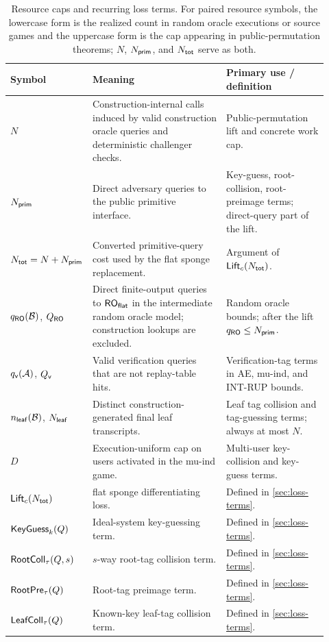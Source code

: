 \begin{table}[t]
  \centering
  \footnotesize
  \setlength{\tabcolsep}{3pt}
  \begin{tabular}{@{}p{0.18\linewidth}p{0.42\linewidth}p{0.32\linewidth}@{}}
    \toprule
    Symbol & Meaning & Primary use / definition \\
    \midrule
    $N$
      & Construction-internal \Keccakp{} calls induced by valid construction
        oracle queries and deterministic challenger checks.
      & Public-permutation lift and concrete work cap. \\
    $N_{\mathsf{prim}}$
      & Direct adversary queries to the public primitive interface.
      & Key-guess, root-collision, root-preimage terms; direct-query part of
        the lift. \\
    $N_{\mathsf{tot}} = N + N_{\mathsf{prim}}$
      & Converted primitive-query cost used by the flat sponge replacement.
      & Argument of $\mathsf{Lift}_c(N_{\mathsf{tot}})$. \\
    $q_{\mathsf{RO}}(\mathcal{B})$, $Q_{\mathsf{RO}}$
      & Direct finite-output queries to $\mathsf{RO}_{\mathsf{flat}}$ in the intermediate random
        oracle model; construction lookups are excluded.
      & Random oracle bounds; after the lift $q_{\mathsf{RO}} \leq N_{\mathsf{prim}}$. \\
    $q_{\mathsf{v}}(\mathcal{A})$, $Q_{\mathsf{v}}$
      & Valid verification queries that are not replay-table hits.
      & Verification-tag terms in AE, mu-ind, and \textsf{INT-RUP} bounds. \\
    $n_{\mathsf{leaf}}(\mathcal{B})$, $N_{\mathsf{leaf}}$
      & Distinct construction-generated final leaf transcripts.
      & Leaf tag collision and tag-guessing terms; always at most $N$. \\
    $D$
      & Execution-uniform cap on users activated in the mu-ind game.
      & Multi-user key-collision and key-guess terms. \\
    \midrule
    $\mathsf{Lift}_c(N_{\mathsf{tot}})$
      & \cite{BDPV08} flat sponge differentiating loss.
      & Defined in \cref{sec:loss-terms}. \\
    $\mathsf{KeyGuess}_k(Q)$
      & Ideal-system key-guessing term.
      & Defined in \cref{sec:loss-terms}. \\
    $\mathsf{RootColl}_\tau(Q, s)$
      & $s$-way root-tag collision term.
      & Defined in \cref{sec:loss-terms}. \\
    $\mathsf{RootPre}_\tau(Q)$
      & Root-tag preimage term.
      & Defined in \cref{sec:loss-terms}. \\
    $\mathsf{LeafColl}_\tau(Q)$
      & Known-key leaf-tag collision term.
      & Defined in \cref{sec:loss-terms}. \\
    \bottomrule
  \end{tabular}
  \caption{Resource caps and recurring loss terms. For paired resource symbols,
    the lowercase form is the realized count in random oracle executions or
    source games and the uppercase form is the cap appearing in
    public-permutation theorems; $N$, $N_{\mathsf{prim}}$, and $N_{\mathsf{tot}}$ serve as both.}
  \label{tab:resource-accounting}
  \label{tab:notation}
\end{table}

